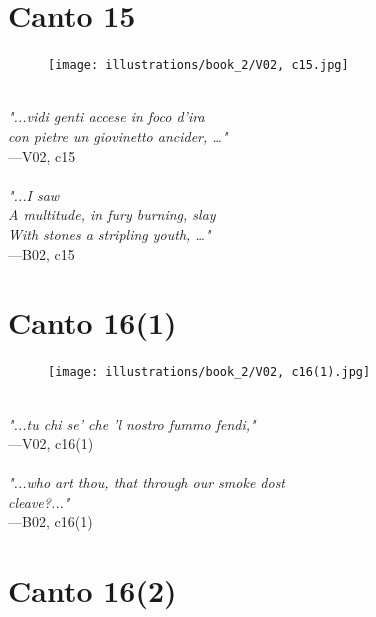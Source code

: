 \documentclass[../Dore_vision.tex]{subfiles}
\begin{document}
\newpage

\section{Canto 15}

\begin{figure}[ht]
\centering
\texttt{[image: illustrations/book\_2/V02, c15.jpg]}
\end{figure}

\begin{center}
\begin{minipage}{0.8\linewidth}
\textit{\\
"...vidi genti accese in foco d’ira\\con pietre un giovinetto ancider, …"} \\
—V02, c15 \\~\\
\textit{"...I saw\\A multitude, in fury burning, slay\\With stones a stripling youth, …"} \\
—B02, c15
\end{minipage}
\end{center}

\newpage

\section{Canto 16(1)}

\begin{figure}[ht]
\centering
\texttt{[image: illustrations/book\_2/V02, c16(1).jpg]}
\end{figure}

\begin{center}
\begin{minipage}{0.8\linewidth}
\textit{\\
"...tu chi se’ che ’l nostro fummo fendi,"} \\
—V02, c16(1) \\~\\
\textit{"...who art thou, that through our smoke dost\\cleave?..."} \\
—B02, c16(1)
\end{minipage}
\end{center}

\newpage

\section{Canto 16(2)}
\end{document}
